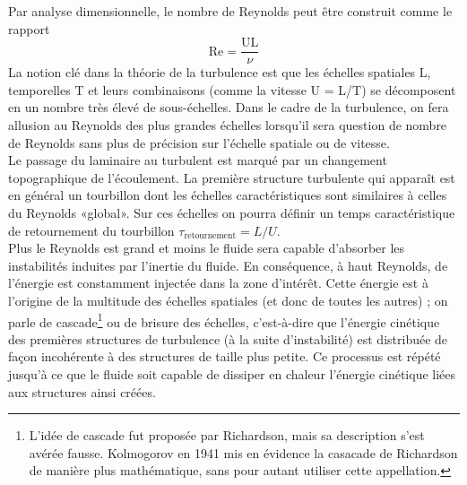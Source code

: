 \documentclass[a4paper,12pt]{article}
\newcommand{\cad}{c'est-à-dire}
\numberwithin{equation}{section} %
\begin{document}
Par analyse dimensionnelle, le nombre de Reynolds peut être construit comme le rapport 
\begin{equation}
 \text{Re} = \frac{\text{UL}}{\nu}
\end{equation} 
 La notion clé dans la théorie de la turbulence est que les échelles spatiales L, temporelles T et leurs combinaisons (comme la vitesse U = L/T) se décomposent en un nombre très élevé de sous-échelles.
Dans le cadre de la turbulence, on fera allusion au Reynolds des plus grandes échelles lorsqu'il sera question de nombre de Reynolds sans plus de précision sur l'échelle spatiale ou de vitesse. \\
Le passage du laminaire au turbulent est marqué par un changement topographique de l'écoulement. La première structure turbulente qui apparaît est en général un tourbillon dont les échelles caractéristiques sont similaires à celles du Reynolds «global». Sur ces échelles on pourra définir un temps caractéristique de retournement du tourbillon $\tau_{\text{retournement}} = L/U$. \\
Plus le Reynolds est grand et moins le fluide sera capable d'absorber les instabilités induites par l'inertie du fluide. En conséquence, à haut Reynolds, de l'énergie est constamment injectée dans la zone d'intérêt. Cette énergie est à l'origine de la multitude des échelles spatiales (et donc de toutes les autres) ; on parle de cascade\footnote{L'idée de cascade fut proposée par Richardson, mais sa description s'est avérée fausse. Kolmogorov en 1941 mis en évidence la casacade de Richardson de manière plus mathématique, sans pour autant utiliser cette appellation.} ou de brisure des échelles, \cad $ $ que l'énergie cinétique des premières structures de turbulence (à la suite d'instabilité) est distribuée de façon incohérente à des structures de taille plus petite. Ce processus est répété jusqu'à ce que le fluide soit capable de dissiper en chaleur l'énergie cinétique liées aux structures ainsi créées. \\
\end{document}
